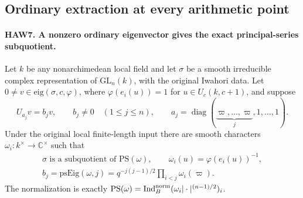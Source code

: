\subsection{Ordinary extraction at every arithmetic point}

\paragraph{HAW7. A nonzero ordinary eigenvector gives the exact principal-series subquotient.}
\label{claim:HAW7}
Let $k$ be any nonarchimedean local field and let $\sigma$ be
a smooth irreducible complex representation of
$\mathrm{GL}_n(k)$, with the original Iwahori data.  Let
$0\ne v\in\mathrm{eig}(\sigma,c,\varphi)$, where
$\varphi(e_i(u))=1$ for $u\in U_c(k,c+1)$, and suppose
\[
 U_{a_j}v=b_jv,\qquad b_j\ne0\quad(1\le j\le n),\qquad
 a_j=\operatorname{diag}(\underbrace{\varpi,\ldots,\varpi}_j,1,\ldots,1).
 \tag{HAW.10}
\]
Under the original local finite-length input there are smooth
characters $\omega_i:k^\times\to\mathbb C^\times$ such that
\[
 \begin{gathered}
 \sigma\text{ is a subquotient of }\mathrm{PS}(\omega),\qquad
 \omega_i(u)=\varphi(e_i(u))^{-1},\\
 b_j=\mathrm{psEig}(\omega,j)
       =q^{-j(j-1)/2}\prod_{i<j}\omega_i(\varpi).
 \end{gathered}
 \tag{HAW.11}
\]
The normalization is exactly
$\mathrm{PS}(\omega)=\operatorname{Ind}^{\rm norm}_B
(\omega_i|\cdot|^{(n-1)/2})_i$.
